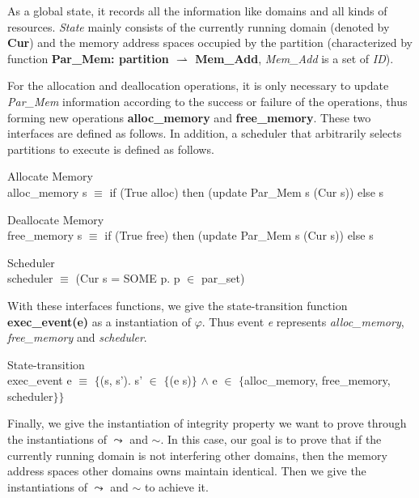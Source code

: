\documentclass[runningheads]{llncs}
\newcommand{\interf}{\leadsto}
\begin{document}
As a global state, it records all the information like domains and all kinds of resources. \textsl{State} mainly consists of the currently running domain (denoted by \textbf{Cur}) and the memory address spaces occupied by the partition (characterized by function \textbf{Par\_Mem: partition $\rightharpoonup$ Mem\_Add}, \textsl{Mem\_Add} is a set of \textsl{ID}).

For the allocation and deallocation operations, it is only necessary to update \textsl{Par\_Mem} information according to the success or failure of the operations, thus forming new operations \textbf{alloc\_memory} and \textbf{free\_memory}. These two interfaces are defined as follows. In addition, a scheduler that arbitrarily selects partitions to execute is defined as follows.

\begin{definition} {Allocate Memory} \\
alloc\_memory s $\equiv$ if (True alloc) then (update Par\_Mem s (Cur s)) else s
\end{definition}

\begin{definition} {Deallocate Memory} \\
free\_memory s $\equiv$ if (True free) then (update Par\_Mem s (Cur s)) else s
\end{definition}

\begin{definition} {Scheduler} \\
scheduler $\equiv$ (Cur s = SOME p. p $\in$ par\_set)
\end{definition}

With these interfaces functions, we give the state-transition function \textbf{exec\_event(e)} as a instantiation of $\varphi$. Thus event \textsl{e} represents \textsl{alloc\_memory}, \textsl{free\_memory} and \textsl{scheduler}.

\begin{definition} {State-transition} \\
exec\_event e $\equiv$ $\lbrace$(s, s'). s' $\in$ $\lbrace$(e s)$\rbrace$ $\wedge$ e $\in$ $\lbrace$alloc\_memory, free\_memory, scheduler$\rbrace$$\rbrace$
\end{definition}

Finally, we give the instantiation of integrity property we want to prove through the instantiations of $\interf$ and $\sim$. In this case, our goal is to prove that if the currently running domain is not interfering other domains, then the memory address spaces other domains owns maintain identical. Then we give the instantiations of $\interf$ and $\sim$ to achieve it.
\end{document}

